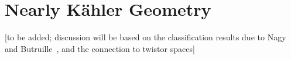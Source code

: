 \chapter{Nearly K\"ahler Geometry}
\label{chap:nearlyK}

[to be added; discussion will be based on the classification results due to Nagy~\cite{Nag2002,Nag2002a} and Butruille~\cite{But2005,But2010}, and the connection to twistor spaces]
